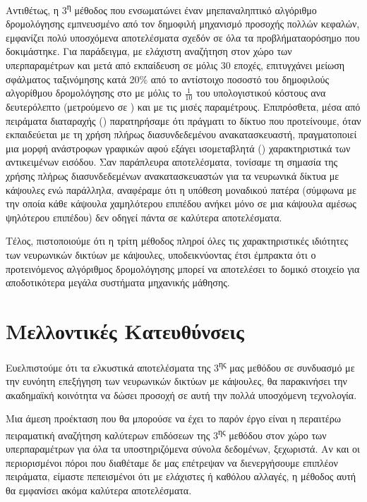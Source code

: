 Αντιθέτως, η 3\textsuperscript{η} μέθοδος που ενσωματώνει έναν μη\textendash επαναληπτικό αλγόριθμο δρομολόγησης εμπνευσμένο από τον δημοφιλή μηχανισμό προσοχής πολλών κεφαλών, εμφανίζει πολύ υποσχόμενα αποτελέσματα σχεδόν σε όλα τα προβλήματα\textendash ορόσημο που δοκιμάστηκε. Για παράδειγμα, με ελάχιστη αναζήτηση στον χώρο των υπερπαραμέτρων και μετά από εκπαίδευση σε μόλις 30 εποχές, επιτυγχάνει μείωση σφάλματος ταξινόμησης κατά 20\% από το αντίστοιχο ποσοστό του δημοφιλούς αλγορίθμου δρομολόγησης  στο   με μόλις το $\frac{1}{10}$ του υπολογιστικού κόστους ανα δευτερόλεπτο (μετρούμενο σε ) και με τις μισές παραμέτρους. Επιπρόσθετα, μέσα από πειράματα διαταραχής () παρατηρήσαμε ότι πράγματι το δίκτυο που προτείνουμε, όταν εκπαιδεύεται με τη χρήση πλήρως διασυνδεδεμένου ανακατασκευαστή, πραγματοποιεί μια μορφή ανάστροφων γραφικών αφού εξάγει ισομεταβλητά () χαρακτηριστικά  των αντικειμένων εισόδου. Σαν παράπλευρα αποτελέσματα, τονίσαμε τη σημασία της χρήσης πλήρως διασυνδεδεμένων ανακατασκευαστών για τα νευρωνικά δίκτυα με κάψουλες ενώ παράλληλα, αναφέραμε ότι η υπόθεση μοναδικού πατέρα (σύμφωνα με την οποία κάθε κάψουλα χαμηλότερου επιπέδου ανήκει μόνο σε μια κάψουλα αμέσως ψηλότερου επιπέδου) δεν οδηγεί πάντα σε καλύτερα αποτελέσματα.\par

Τέλος, πιστοποιούμε ότι η τρίτη μέθοδος πληροί όλες τις χαρακτηριστικές ιδιότητες των νευρωνικών δικτύων με κάψουλες, υποδεικνύοντας έτσι έμπρακτα ότι ο προτεινόμενος αλγόριθμος δρομολόγησης μπορεί να αποτελέσει το δομικό στοιχείο για αποδοτικότερα μεγάλα συστήματα μηχανικής μάθησης.

\section{Μελλοντικές Κατευθύνσεις}
Ευελπιστούμε ότι τα ελκυστικά αποτελέσματα της 3\textsuperscript{ης} μας μεθόδου σε συνδυασμό με την ευνόητη επεξήγηση των νευρωνικών δικτύων με κάψουλες, θα παρακινήσει την ακαδημαϊκή κοινότητα να δώσει προσοχή σε αυτή την πολλά υποσχόμενη τεχνολογία.\par

Μια άμεση προέκταση που θα μπορούσε να έχει το παρόν έργο είναι η περαιτέρω πειραματική αναζήτηση καλύτερων επιδόσεων της 3\textsuperscript{ης} μεθόδου στον χώρο των υπερπαραμέτρων για όλα τα υποστηριζόμενα σύνολα δεδομένων, ξεχωριστά. Αν και οι περιορισμένοι πόροι που διαθέταμε δε μας επέτρεψαν να διενεργήσουμε επιπλέον πειράματα, είμαστε πεπεισμένοι ότι  με ελάχιστες ή καθόλου αλλαγές, η μέθοδος αυτή θα εμφανίσει ακόμα καλύτερα αποτελέσματα.\par

